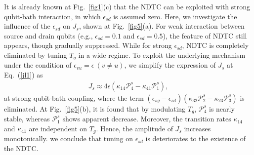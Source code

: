 \documentclass[twocolumn,preprintnumbers,amsmath,amssymb]{revtex4}
\begin{document}
It is already known at Fig.~\ref{fig1}(c) that  the NDTC can be exploited with strong qubit-bath interaction,
in which $\epsilon_{sd}$ is assumed zero.
Here, we investigate the influence of the $\epsilon_{sd}$ on $J_s$, shown at Fig.~\ref{fig5}(a).
For weak interaction between source and drain qubits (e.g., $\epsilon_{sd}=0.1$ and $\epsilon_{sd}=0.5$),
the feature of NDTC still appears, though gradually suppressed.
While for strong $\epsilon_{sd}$, NDTC is completely eliminated by tuning $T_g$ in a wide regime.
To exploit the underlying mechanism under the condition of $\epsilon_{vu}=\epsilon~(v{\neq}u)$, we simplify the expression of $J_s$ at Eq.~(\ref{jl1}) as
\begin{eqnarray}
J_s{\approx}4\epsilon(\kappa_{14}\mathcal{P}^s_4-\kappa_{41}\mathcal{P}^s_1),
\end{eqnarray}
at strong qubit-bath coupling, where the term $(\epsilon_{sg}-\epsilon_{sd})(\kappa_{32}\mathcal{P}^s_2-\kappa_{23}\mathcal{P}^s_3)$
is eliminated.
At Fig.~\ref{fig5}(b),
it is found that by modulating $T_g$, $\mathcal{P}^s_4$ is nearly stable,
whereas $\mathcal{P}^s_1$ shows apparent decrease.
Moreover, the transition rates $\kappa_{14}$ and $\kappa_{41}$ are independent on $T_g$.
Hence, the amplitude of $J_s$ increases monotonically.
we conclude that tuning on $\epsilon_{sd}$ is deteriorates to the existence of the NDTC.
\end{document}
